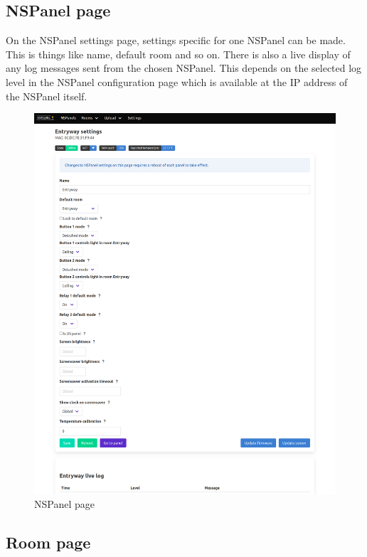 \documentclass[10pt]{article}
\begin{document}
    \subsection{NSPanel page}
    \label{sec:nspanel_page}

    On the NSPanel settings page, settings specific for one NSPanel can be made. This is things like name, default room and so on. There is also a live display of any log messages sent from the chosen NSPanel. This depends on the selected log level in the NSPanel configuration page which is available at the IP address of the NSPanel itself.

    \begin{figure}[H]
    \centering
    \includegraphics[scale=0.25,keepaspectratio]{nspanel_page.png}
    \caption{NSPanel page}%
    \end{figure}
    \subsection{Room page}
    \label{sec:room_page}
    
\end{document}

